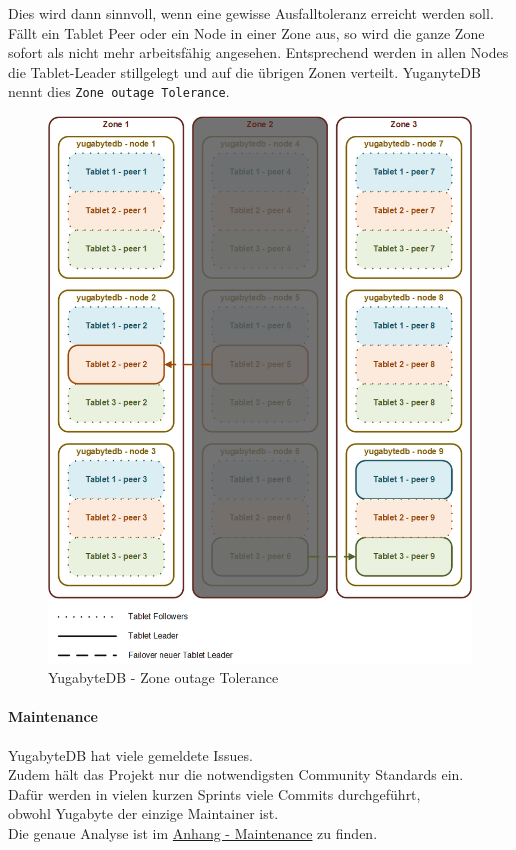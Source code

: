 \begin{flushleft}
    Dies wird dann sinnvoll, wenn eine gewisse Ausfalltoleranz erreicht werden soll.
    Fällt ein Tablet Peer oder ein Node in einer Zone aus, so wird die ganze Zone sofort als nicht mehr arbeitsfähig angesehen.
    Entsprechend werden in allen Nodes die Tablet-Leader stillgelegt und auf die übrigen Zonen verteilt.
    YuganyteDB nennt dies \texttt{Zone outage Tolerance}\cite{PTKCP8A4}.
    \begin{figure}[H]
        \centering
        \includegraphics[width=0.8\linewidth]{source/implementation/evaluation/postgresql_ha_solutions/yugabytedb/yugabytedb-zone-outage-tolerance}
        \caption{YugabyteDB - Zone outage Tolerance}
        \label{fig:yugabytedb-zone-outage-tolerance}
    \end{figure}
\end{flushleft}
\begin{flushleft}
    \paragraph{Maintenance}
    YugabyteDB hat viele gemeldete Issues.\\
    Zudem hält das Projekt nur die notwendigsten Community Standards ein.\\
    Dafür werden in vielen kurzen Sprints viele Commits durchgeführt,\\
    obwohl Yugabyte der einzige Maintainer ist.\\
    Die genaue Analyse ist im \hyperref[subsec:maintenance_patroni]{Anhang - Maintenance} zu finden.
\end{flushleft}

